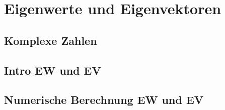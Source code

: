 \section{Eigenwerte und Eigenvektoren}

\subsection{Komplexe Zahlen}

\subsection{Intro EW und EV}

\subsection{Numerische Berechnung EW und EV}

